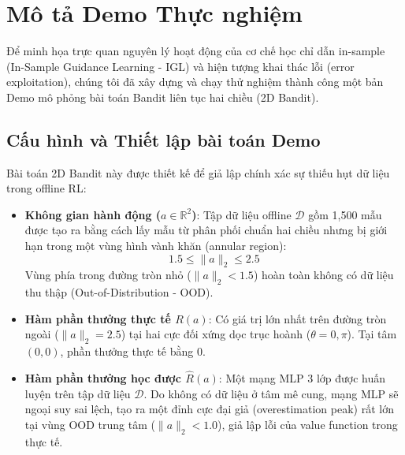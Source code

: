 \section{Mô tả Demo Thực nghiệm}
\label{sec:demo_description}

Để minh họa trực quan nguyên lý hoạt động của cơ chế học chỉ dẫn in-sample (In-Sample Guidance Learning - IGL) và hiện tượng khai thác lỗi (error exploitation), chúng tôi đã xây dựng và chạy thử nghiệm thành công một bản Demo mô phỏng bài toán Bandit liên tục hai chiều (2D Bandit).

\subsection{Cấu hình và Thiết lập bài toán Demo}
Bài toán 2D Bandit này được thiết kế để giả lập chính xác sự thiếu hụt dữ liệu trong offline RL:
\begin{itemize}
    \item \textbf{Không gian hành động ($a \in \mathbb{R}^2$)}: Tập dữ liệu offline $\mathcal{D}$ gồm 1,500 mẫu được tạo ra bằng cách lấy mẫu từ phân phối chuẩn hai chiều nhưng bị giới hạn trong một vùng hình vành khăn (annular region):
    $$1.5 \leq \|a\|_2 \leq 2.5$$
    Vùng phía trong đường tròn nhỏ ($\|a\|_2 < 1.5$) hoàn toàn không có dữ liệu thu thập (Out-of-Distribution - OOD).
    \item \textbf{Hàm phần thưởng thực tế $R(a)$}: Có giá trị lớn nhất trên đường tròn ngoài ($\|a\|_2 = 2.5$) tại hai cực đối xứng dọc trục hoành ($\theta = 0, \pi$). Tại tâm $(0,0)$, phần thưởng thực tế bằng 0.
    \item \textbf{Hàm phần thưởng học được $\hat{R}(a)$}: Một mạng MLP 3 lớp được huấn luyện trên tập dữ liệu $\mathcal{D}$. Do không có dữ liệu ở tâm mê cung, mạng MLP sẽ ngoại suy sai lệch, tạo ra một đỉnh cực đại giả (overestimation peak) rất lớn tại vùng OOD trung tâm ($\|a\|_2 < 1.0$), giả lập lỗi của value function trong thực tế.
\end{itemize}

